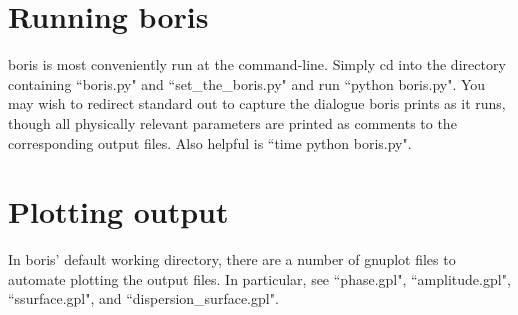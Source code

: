 \documentclass{article}
\begin{document}
\section{Running boris}
boris is most conveniently run at the command-line. 
Simply cd into the directory containing ``boris.py" and ``set\_{}the\_{}boris.py" and run ``python boris.py". 
You may wish to redirect standard out to capture the dialogue boris prints as it runs, though all physically relevant parameters are printed as comments to the corresponding output files. 
Also helpful is ``time python boris.py".
\section{Plotting output}
In boris' default working directory, there are a number of gnuplot files to automate plotting the output files. In particular, see ``phase.gpl", ``amplitude.gpl", ``ssurface.gpl", and ``dispersion\_{}surface.gpl".
\end{document}
